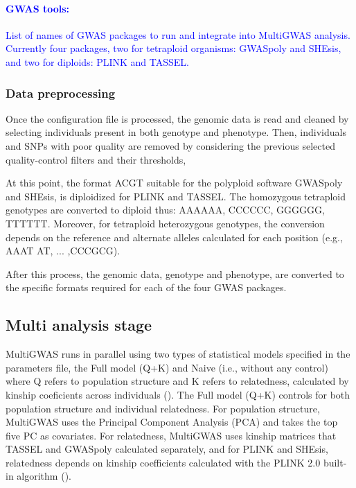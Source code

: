 \documentclass{article}
\begin{document}
\paragraph{\textcolor{blue}{GWAS tools:}}

\textcolor{blue}{List of names of GWAS packages to run and integrate into MultiGWAS analysis. Currently four packages, two for tetraploid organisms: GWASpoly and SHEsis, and two for diploids: PLINK and TASSEL. }

\subsubsection{Data preprocessing}

Once the configuration file is processed, the genomic data is read and cleaned by selecting individuals present in both genotype and phenotype. Then, individuals and SNPs with poor quality are removed by considering the previous selected quality-control filters and their thresholds, 

At this point, the format \textquotedbl{}ACGT\textquotedbl{} suitable for the polyploid software GWASpoly and SHEsis, is \textquotedbl{}diploidized\textquotedbl{} for PLINK and TASSEL. The homozygous tetraploid genotypes are converted to diploid thus: AAAA\textrightarrow AA, CCCC\textrightarrow CC, GGGG\textrightarrow GG, TTTT\textrightarrow TT. Moreover, for tetraploid heterozygous genotypes, the conversion depends on the reference and alternate alleles calculated for each position (e.g., AAAT \textrightarrow AT, ... ,CCCG\textrightarrow CG). 

After this process, the genomic data, genotype and phenotype, are converted to the specific formats required for each of the four GWAS packages.

\subsection{Multi analysis stage}
MultiGWAS runs in parallel using two types of statistical models specified in the parameters file, the Full model (Q+K) and Naive (i.e., without any control) where Q refers to population structure and K refers to relatedness, calculated by kinship coeficients across individuals (\cite{Sharma2018}). The Full model (Q+K) controls for both population structure and individual relatedness. For population structure, MultiGWAS uses the Principal Component Analysis (PCA) and takes the top five PC as covariates. For relatedness, MultiGWAS uses kinship matrices that TASSEL and GWASpoly calculated separately, and for PLINK and SHEsis, relatedness depends on kinship coefficients calculated with the PLINK 2.0 built-in algorithm (\cite{Chang2015}). 
\end{document}
